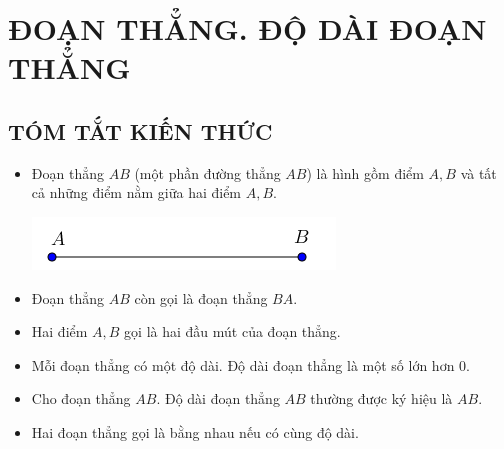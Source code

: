 \section{ĐOẠN THẲNG. ĐỘ DÀI ĐOẠN THẲNG}
\subsection{TÓM TẮT KIẾN THỨC}
\begin{tomtat}
\begin{itemize}
\item Đoạn thẳng $AB$ (một phần đường thẳng $AB$) là hình gồm điểm $A, B$ và tất cả những điểm nằm giữa hai điểm $A, B$.
	\begin{center}
	\includegraphics[scale=0.7]{img/bai5_h1}
	\end{center}
\item Đoạn thẳng $AB$ còn gọi là đoạn thẳng $BA$.
\item Hai điểm $A, B$ gọi là hai đầu mút của đoạn thẳng.
\item Mỗi đoạn thẳng có một độ dài. Độ dài đoạn thẳng là một số lớn hơn $0$.
\item Cho đoạn thẳng $AB$. Độ dài đoạn thẳng $AB$ thường được ký hiệu là $AB$.
\item Hai đoạn thẳng gọi là bằng nhau nếu có cùng độ dài.
\end{itemize}
\end{tomtat}

